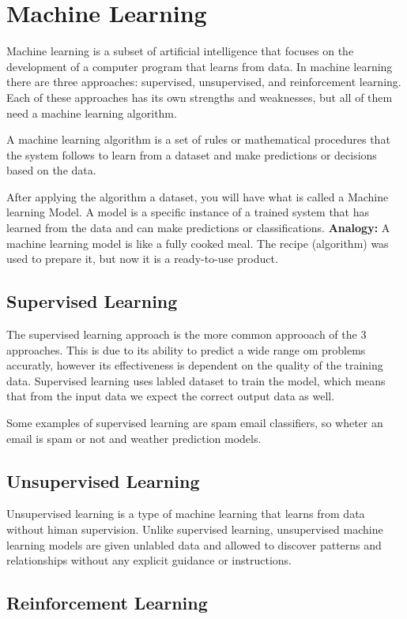 \section{Machine Learning}
\label{sec:Machine Learning}

Machine learning is a subset of artificial intelligence 
that focuses on the development of a computer program that learns from data.
In machine learning there are three approaches: supervised, unsupervised, and reinforcement learning.
Each of these approaches has its own strengths and weaknesses, but all of them need a machine learning algorithm.

A machine learning algorithm is a set of rules or mathematical 
procedures that the system follows to learn from a dataset 
and make predictions or decisions based on the data.

After applying the algorithm a dataset, you will have what is called a Machine learning Model.
A model is a specific instance of a trained system that has learned from the data and can make predictions or classifications.
\cite{ML-Models}
\textbf{Analogy:} A machine learning model is like a fully cooked meal. 
The recipe (algorithm) was used to prepare it, but now it is a ready-to-use product.



\subsection{Supervised Learning}
The supervised learning approach is the more common approoach of the 3 approaches.
This is due to its ability to predict a wide range om problems accuratly, 
however its effectiveness is dependent on the quality of the training data.
Supervised learning uses labled dataset to train the model, 
which means that from the input data we expect the correct output data as well.
\cite{GoogleCloud-SL}

Some examples of supervised learning are spam email classifiers, 
so wheter an email is spam or not and weather prediction models.

\subsection{Unsupervised Learning}
Unsupervised learning is a type of machine learning 
that learns from data without himan supervision. Unlike supervised learning,
unsupervised machine learning models are given unlabled data and allowed to discover patterns 
and relationships without any explicit guidance or instructions. \cite{GoogleCloud-UL}


\subsection{Reinforcement Learning}